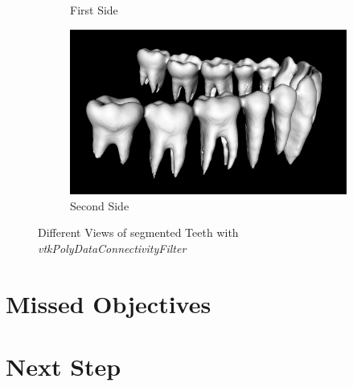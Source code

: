\documentclass[11.5pt, b5paper]{article}
\begin{document}
\begin{figure}
\begin{subfigure}[b]{0.5\textwidth}
        \caption{First Side}
    \end{subfigure}
        \hfill
    \begin{subfigure}[b]{0.5\textwidth}
        \centering
        \includegraphics[width=\textwidth]{MCS2}
        \caption{Second Side}
    \end{subfigure}
    \caption{Different Views of segmented Teeth with \textit{vtkPolyDataConnectivityFilter}}
    \label{fig:PDCF}
\end{figure}

\section{Missed Objectives}

\section{Next Step}
   
\end{document}
